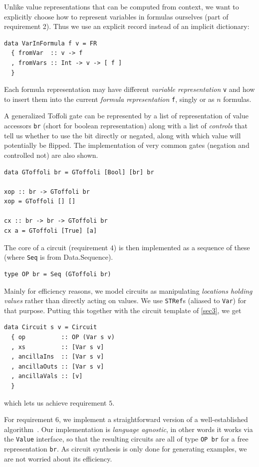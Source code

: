 \documentclass[sigplan,screen]{acmart}
\theoremstyle{definition}
\begin{document}
Unlike value representations that can be computed from context, we
want to explicitly choose how to represent variables in formulas
ourselves (part of requirement 2).  Thus we use an explicit record instead of an
implicit dictionary:

\begin{verbatim}
data VarInFormula f v = FR
  { fromVar  :: v -> f
  , fromVars :: Int -> v -> [ f ]
  }
\end{verbatim}
Each formula representation may have different
\emph{variable representation} \texttt{v}
and how to insert them into the current \emph{formula representation} \texttt{f},
singly or as $n$ formulas.

A generalized Toffoli gate can be represented by a list of representation of
value accessors \texttt{br} (short for boolean representation) along with a list
of \emph{controls} that tell us whether to use the bit directly or negated,
along with which value will potentially be flipped. The implementation of very
common gates (negation and controlled not) are also shown.
\begin{verbatim}
data GToffoli br = GToffoli [Bool] [br] br

xop :: br -> GToffoli br
xop = GToffoli [] []

cx :: br -> br -> GToffoli br
cx a = GToffoli [True] [a]
\end{verbatim}
\noindent The core of a circuit (requirement $4$) is then implemented as a
sequence of these (where \texttt{Seq} is from {Data.Sequence}).
\begin{verbatim}
type OP br = Seq (GToffoli br)
\end{verbatim}

\noindent Mainly for efficiency reasons, we model circuits as manipulating
\emph{locations holding values} rather than directly acting on values. We
use \texttt{STRef}s (aliased to \texttt{Var}) for that purpose. Putting this
together with the circuit template of \ref{sec3}, we get
\begin{verbatim}
data Circuit s v = Circuit
  { op          :: OP (Var s v)
  , xs          :: [Var s v]
  , ancillaIns  :: [Var s v]
  , ancillaOuts :: [Var s v]
  , ancillaVals :: [v]
  }
\end{verbatim}
\noindent which lets us achieve requirement $5$.

For requirement $6$, we implement a straightforward version of a
well-established algorithm~\cite{soeken2016fast}. Our implementation
is \emph{language agnostic}, in other words it works via the
\texttt{Value} interface, so that the resulting circuits are all of
type \texttt{OP br} for a free representation \texttt{br}. As circuit
synthesis is only done for generating examples, we are not worried
about its efficiency.
\end{document}
